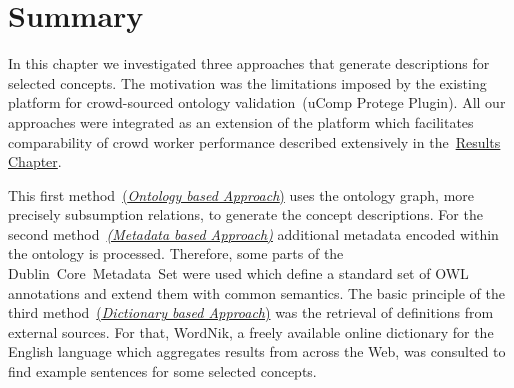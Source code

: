 \section{Summary}\label{sec:approaches_summary}
In this chapter we investigated three approaches that generate descriptions for selected concepts. The motivation was 
the limitations imposed by the existing platform for crowd-sourced ontology validation~(uComp Protege Plugin). All our approaches
were integrated as an extension of the platform which facilitates comparability of crowd worker performance described extensively in
the~\hyperref[chap:results]{Results Chapter}. 

This first method~\hyperref[sec:enrichment_ontology_approach]{(\emph{Ontology based Approach})} uses the ontology graph, more precisely
subsumption relations, to generate the concept descriptions. For the second method~\hyperref[sec:enrichment_metaData_approach]{\emph{(Metadata
based Approach)}} additional metadata encoded within the ontology is processed. Therefore, some parts of the Dublin~Core~Metadata~Set were used
which define a standard set of OWL annotations and extend them with common semantics. The basic principle of the third 
method~\hyperref[sec:enrichment_dictionary_approach]{(\emph{Dictionary based Approach})} was the retrieval of definitions from external sources. For that, WordNik, a freely available online dictionary for the English language which aggregates results from across the Web, was consulted to find example sentences for some selected concepts.


